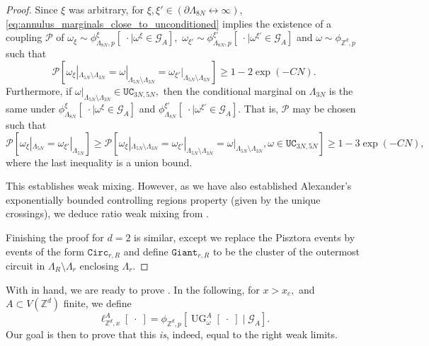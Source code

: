 \documentclass[article,11pt,reqno]{amsart}
\newcommand{\Z}{\mathbb{Z}}
\newcommand{\cc}{\leftrightarrow}
\begin{document}
\begin{proof}
Since $\xi$ was arbitrary, for $\xi,\xi'\in (\partial \Lambda_{8N}\cc \infty),$ \eqref{eq:annulus_marginals_close_to_unconditioned} implies the existence of a coupling $\mathscr{P}$ of $\omega_{\xi}\sim \phi^{\xi}_{\Lambda_{8N},p}[\;\cdot\mid \omega^{\xi}\in \mathcal{G}_A],$ $\omega_{\xi'}\sim\phi^{\xi'}_{\Lambda_{8N},p}[\;\cdot\mid \omega^{\xi'}\in \mathcal{G}_A]$ and $\omega\sim\phi_{\mathbb{Z}^d,p}$ such that 
$$
\mathscr{P}[\omega_{\xi}|_{\Lambda_{5N}\setminus \Lambda_{3N}}=\omega|_{\Lambda_{5N}\setminus \Lambda_{3N}}=\omega_{\xi'}|_{\Lambda_{5N}\setminus \Lambda_{3N}}]\geq 1-2\exp(-CN).
$$
Furthermore, if $\omega|_{\Lambda_{5N}\setminus \Lambda_{3N}}\in \mathtt{UC}_{3N,5N},$ then the conditional marginal on $\Lambda_{3N}$ is the same under $\phi^{\xi}_{\Lambda_{8N}}[\;\cdot\mid \omega^{\xi}\in \mathcal{G}_A]$ and $\phi^{\xi'}_{\Lambda_{8N}}[\;\cdot\mid \omega^{\xi'}\in \mathcal{G}_A]$. That is, $\mathscr{P}$ may be chosen such that
$$
\mathscr{P}[\omega_{\xi}|_{\Lambda_{5N}}=\omega_{\xi'}|_{\Lambda_{5N}}]\geq \mathscr{P}[\omega_{\xi}|_{\Lambda_{5N}\setminus \Lambda_{3N}}=\omega_{\xi'}|_{\Lambda_{5N}\setminus \Lambda_{3N}}=\omega|_{\Lambda_{5N}\setminus \Lambda_{3N}}, \omega\in \mathtt{UC}_{3N,5N} ]\geq 1-3\exp(-CN),
$$
where the last inequality is a union bound.

This establishes weak mixing. However, as we have also established Alexander's exponentially bounded controlling regions property (given by the unique crossings), we deduce ratio weak mixing from \cite[Theorem 3.3]{alexander1998weak}.

Finishing the proof for $d= 2$ is similar, except we replace the Pisztora events by events of the form $\mathtt{Circ}_{r,R}$ and define $\mathtt{Giant}_{r,R}$ to be the cluster of the outermost circuit in $\Lambda_R\setminus \Lambda_r$ enclosing $\Lambda_r.$
\end{proof}






With  in hand, we are ready to prove .
In the following, for $x>x_c,$ and $A\subset V(\Z^d)$ finite, we define 
$$
\ell^A_{\mathbb{Z}^d,x}[\;\cdot\;]=\phi_{\mathbb{Z}^d,p}[\operatorname{UG}^A_{\omega}[\;\cdot\;]\mid \mathcal{G}_A].
$$
Our goal is then to prove that this \textit{is}, indeed, equal to the right weak limits.
\end{document}
